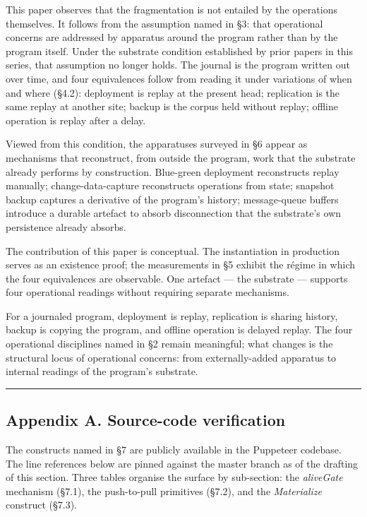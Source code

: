 \documentclass[
]{article}
\begin{document}
This paper observes that the fragmentation is not entailed by the
operations themselves. It follows from the assumption named in §3: that
operational concerns are addressed by apparatus around the program
rather than by the program itself. Under the substrate condition
established by prior papers in this series, that assumption no longer
holds. The journal is the program written out over time, and four
equivalences follow from reading it under variations of when and where
(§4.2): deployment is replay at the present head; replication is the
same replay at another site; backup is the corpus held without replay;
offline operation is replay after a delay.

Viewed from this condition, the apparatuses surveyed in §6 appear as
mechanisms that reconstruct, from outside the program, work that the
substrate already performs by construction. Blue-green deployment
reconstructs replay manually; change-data-capture reconstructs
operations from state; snapshot backup captures a derivative of the
program's history; message-queue buffers introduce a durable artefact to
absorb disconnection that the substrate's own persistence already
absorbs.

The contribution of this paper is conceptual. The instantiation in
production serves as an existence proof; the measurements in §5 exhibit
the régime in which the four equivalences are observable. One artefact
--- the substrate --- supports four operational readings without
requiring separate mechanisms.

For a journaled program, deployment is replay, replication is sharing
history, backup is copying the program, and offline operation is delayed
replay. The four operational disciplines named in §2 remain meaningful;
what changes is the structural locus of operational concerns: from
externally-added apparatus to internal readings of the program's
substrate.

\begin{center}\rule{0.5\linewidth}{0.5pt}\end{center}

\subsection{Appendix A. Source-code
verification}\label{appendix-a.-source-code-verification}

The constructs named in §7 are publicly available in the Puppeteer
codebase. The line references below are pinned against the master branch
as of the drafting of this section. Three tables organise the surface by
sub-section: the \emph{aliveGate} mechanism (§7.1), the push-to-pull
primitives (§7.2), and the \emph{Materialize} construct (§7.3).
\end{document}
